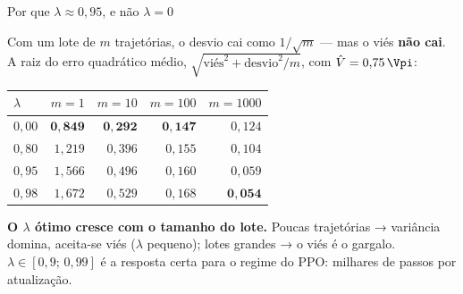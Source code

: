 \documentclass[aspectratio=169, 10pt]{beamer}
\newcommand{\Vhat}{\hat{V}}
\begin{document}
\begin{frame}{Por que $\lambda \approx 0{,}95$, e não $\lambda = 0$}

  Com um lote de $m$ trajetórias, o desvio cai como $1/\sqrt{m}$ --- mas o viés
  \textbf{não cai}. A raiz do erro quadrático médio,
  $\sqrt{\text{viés}^2 + \text{desvio}^2/m}$, com $\Vhat = 0{,}75\,\Vpi$:

  \begin{center}\small
  \begin{tabular}{@{}lrrrr@{}}
    \toprule
    $\lambda$ & $m=1$ & $m=10$ & $m=100$ & $m=1000$\\
    \midrule
    $0{,}00$ & $\mathbf{0{,}849}$ & $\mathbf{0{,}292}$ & $\mathbf{0{,}147}$ & $0{,}124$\\
    $0{,}80$ & $1{,}219$ & $0{,}396$ & $0{,}155$ & $0{,}104$\\
    $0{,}95$ & $1{,}566$ & $0{,}496$ & $0{,}160$ & $0{,}059$\\
    $0{,}98$ & $1{,}672$ & $0{,}529$ & $0{,}168$ & $\mathbf{0{,}054}$\\
    \bottomrule
  \end{tabular}
  \end{center}

  \begin{ideiabox}
    \textbf{O $\lambda$ ótimo cresce com o tamanho do lote.} Poucas trajetórias →
    variância domina, aceita-se viés ($\lambda$ pequeno); lotes grandes → o viés é o
    gargalo. $\lambda \in [0{,}9;\,0{,}99]$ é a resposta certa para o regime do PPO:
    milhares de passos por atualização.
  \end{ideiabox}
\end{frame}
\end{document}
